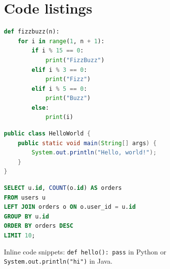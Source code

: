 \documentclass{article}
\begin{document}
\section{Code listings}

\begin{lstlisting}[language=Python, caption={Python FizzBuzz}]
def fizzbuzz(n):
    for i in range(1, n + 1):
        if i % 15 == 0:
            print("FizzBuzz")
        elif i % 3 == 0:
            print("Fizz")
        elif i % 5 == 0:
            print("Buzz")
        else:
            print(i)
\end{lstlisting}

\begin{lstlisting}[language=Java]
public class HelloWorld {
    public static void main(String[] args) {
        System.out.println("Hello, world!");
    }
}
\end{lstlisting}

\begin{lstlisting}[language=SQL]
SELECT u.id, COUNT(o.id) AS orders
FROM users u
LEFT JOIN orders o ON o.user_id = u.id
GROUP BY u.id
ORDER BY orders DESC
LIMIT 10;
\end{lstlisting}

Inline code snippets: \lstinline|def hello(): pass| in Python or \lstinline+System.out.println("hi")+ in Java.
\end{document}
